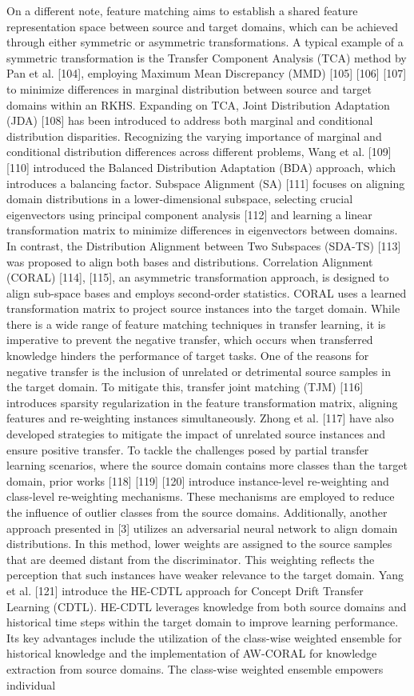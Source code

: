 On a different note, feature matching aims to establish a shared feature representation space between source and target domains, which can be achieved through either symmetric or asymmetric transformations. A typical example of a symmetric transformation is the Transfer Component Analysis (TCA) method by Pan et al. [104], employing Maximum Mean Discrepancy (MMD) [105] [106] [107] to minimize differences in marginal distribution between source and target domains within an RKHS. Expanding on TCA, Joint Distribution Adaptation (JDA) [108] has been introduced to address both marginal and conditional distribution disparities. Recognizing the varying importance of marginal and conditional distribution differences across different problems, Wang et al. [109] [110] introduced the Balanced Distribution Adaptation (BDA) approach, which introduces a balancing factor. Subspace Alignment (SA) [111] focuses on aligning domain distributions in a lower-dimensional subspace, selecting crucial eigenvectors using principal component analysis [112] and learning a linear transformation matrix to minimize differences in eigenvectors between domains. In contrast, the Distribution Alignment between Two Subspaces (SDA-TS) [113] was proposed to align both bases and distributions. Correlation Alignment (CORAL) [114], [115], an asymmetric transformation approach, is designed to align sub-space bases and employs second-order statistics. CORAL uses a learned transformation matrix to project source instances into the target domain. While there is a wide range of feature matching techniques in transfer learning, it is imperative to prevent the negative transfer, which occurs when transferred knowledge hinders the performance of target tasks. One of the reasons for negative transfer is the inclusion of unrelated or detrimental source samples in the target domain. To mitigate this, transfer joint matching (TJM) [116] introduces sparsity regularization in the feature transformation matrix, aligning features and re-weighting instances simultaneously. Zhong et al. [117] have also developed strategies to mitigate the impact of unrelated source instances and ensure positive transfer. To tackle the challenges posed by partial transfer learning scenarios, where the source domain contains more classes than the target domain, prior works [118] [119] [120] introduce instance-level re-weighting and class-level re-weighting mechanisms. These mechanisms are employed to reduce the influence of outlier classes from the source domains. Additionally, another approach presented in [3] utilizes an adversarial neural network to align domain distributions. In this method, lower weights are assigned to the source samples that are deemed distant from the discriminator. This weighting reflects the perception that such instances have weaker relevance to the target domain. Yang et al. [121] introduce the HE-CDTL approach for Concept Drift Transfer Learning (CDTL). HE-CDTL leverages knowledge from both source domains and historical time steps within the target domain to improve learning performance. Its key advantages include the utilization of the class-wise weighted ensemble for historical knowledge and the implementation of AW-CORAL for knowledge extraction from source domains. The class-wise weighted ensemble empowers individual 